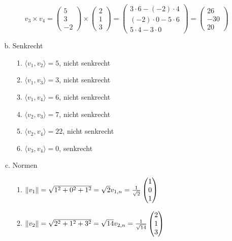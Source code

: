 \documentclass{standalone}
\begin{document}
\begin{enumerate}[a)]
\begin{enumerate}
        $ v_3 \times v_4 = 
        \begin{pmatrix}
            5 \\ 3 \\ -2
        \end{pmatrix}
        \times \begin{pmatrix}
            2 \\ 1 \\ 3
        \end{pmatrix}
        = \begin{pmatrix}
            3 \cdot 6 - (-2) \cdot 4 \\ (-2) \cdot 0 - 5 \cdot 6 \\ 5 \cdot 4 - 3 \cdot 0
        \end{pmatrix}
        = \begin{pmatrix}
            26 \\ -30 \\ 20
        \end{pmatrix}$
    \end{enumerate}
    \item Senkrecht
    \begin{enumerate}
        \item $\langle v_1,v_2 \rangle = 5$, nicht senkrecht
        \item $\langle v_1,v_3 \rangle = 3$, nicht senkrecht
        \item $\langle v_1,v_4 \rangle = 6$, nicht senkrecht
        \item $\langle v_2,v_3 \rangle = 7$, nicht senkrecht
        \item $\langle v_2,v_4 \rangle = 22$, nicht senkrecht
        \item $\langle v_3,v_4 \rangle = 0$, senkrecht
    \end{enumerate}
    \item Normen
    \begin{enumerate}
        \item $\left\lVert v_1\right\rVert = \sqrt{1^2 + 0^2 + 1^2} = \sqrt{2} \\ v_{1,n} = \frac{1}{\sqrt{2}}\begin{pmatrix} 1 \\ 0 \\ 1 \end{pmatrix}$
        \item $\left\lVert v_2\right\rVert = \sqrt{2^2 + 1^2 + 3^2} = \sqrt{14} \\ v_{2,n} = \frac{1}{\sqrt{14}}\begin{pmatrix} 2 \\ 1 \\ 3 \end{pmatrix}$

\end{enumerate}
\end{enumerate}
\end{document}
